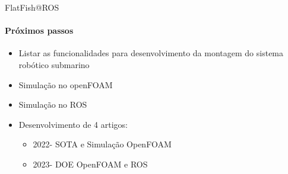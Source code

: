 \begin{frame}[t]{FlatFish@ROS}
    \framesubtitle{Próximos passos}
    \begin{itemize}
        \item Listar as funcionalidades para desenvolvimento da montagem do sistema robótico submarino
        \item Simulação no openFOAM
        \item Simulação no ROS
        \item Desenvolvimento de 4 artigos: 
        \begin{itemize}
            \item[] 2022- SOTA e Simulação OpenFOAM
            \item[] 2023- DOE OpenFOAM e ROS 
        \end{itemize}  
        
    \end{itemize}    
\end{frame}


